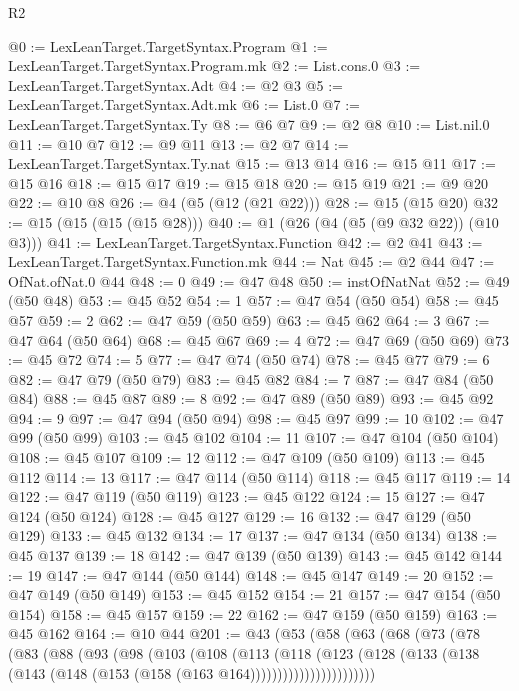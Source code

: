 \begin{lexlean}{R2}
\begin{coremodule}
@0 := LexLeanTarget.TargetSyntax.Program
@1 := LexLeanTarget.TargetSyntax.Program.mk
@2 := List.cons.{0}
@3 := LexLeanTarget.TargetSyntax.Adt
@4 := @2 @3
@5 := LexLeanTarget.TargetSyntax.Adt.mk
@6 := List.{0}
@7 := LexLeanTarget.TargetSyntax.Ty
@8 := @6 @7
@9 := @2 @8
@10 := List.nil.{0}
@11 := @10 @7
@12 := @9 @11
@13 := @2 @7
@14 := LexLeanTarget.TargetSyntax.Ty.nat
@15 := @13 @14
@16 := @15 @11
@17 := @15 @16
@18 := @15 @17
@19 := @15 @18
@20 := @15 @19
@21 := @9 @20
@22 := @10 @8
@26 := @4 (@5 (@12 (@21 @22)))
@28 := @15 (@15 @20)
@32 := @15 (@15 (@15 (@15 @28)))
@40 := @1 (@26 (@4 (@5 (@9 @32 @22)) (@10 @3)))
@41 := LexLeanTarget.TargetSyntax.Function
@42 := @2 @41
@43 := LexLeanTarget.TargetSyntax.Function.mk
@44 := Nat
@45 := @2 @44
@47 := OfNat.ofNat.{0} @44
@48 := 0
@49 := @47 @48
@50 := instOfNatNat
@52 := @49 (@50 @48)
@53 := @45 @52
@54 := 1
@57 := @47 @54 (@50 @54)
@58 := @45 @57
@59 := 2
@62 := @47 @59 (@50 @59)
@63 := @45 @62
@64 := 3
@67 := @47 @64 (@50 @64)
@68 := @45 @67
@69 := 4
@72 := @47 @69 (@50 @69)
@73 := @45 @72
@74 := 5
@77 := @47 @74 (@50 @74)
@78 := @45 @77
@79 := 6
@82 := @47 @79 (@50 @79)
@83 := @45 @82
@84 := 7
@87 := @47 @84 (@50 @84)
@88 := @45 @87
@89 := 8
@92 := @47 @89 (@50 @89)
@93 := @45 @92
@94 := 9
@97 := @47 @94 (@50 @94)
@98 := @45 @97
@99 := 10
@102 := @47 @99 (@50 @99)
@103 := @45 @102
@104 := 11
@107 := @47 @104 (@50 @104)
@108 := @45 @107
@109 := 12
@112 := @47 @109 (@50 @109)
@113 := @45 @112
@114 := 13
@117 := @47 @114 (@50 @114)
@118 := @45 @117
@119 := 14
@122 := @47 @119 (@50 @119)
@123 := @45 @122
@124 := 15
@127 := @47 @124 (@50 @124)
@128 := @45 @127
@129 := 16
@132 := @47 @129 (@50 @129)
@133 := @45 @132
@134 := 17
@137 := @47 @134 (@50 @134)
@138 := @45 @137
@139 := 18
@142 := @47 @139 (@50 @139)
@143 := @45 @142
@144 := 19
@147 := @47 @144 (@50 @144)
@148 := @45 @147
@149 := 20
@152 := @47 @149 (@50 @149)
@153 := @45 @152
@154 := 21
@157 := @47 @154 (@50 @154)
@158 := @45 @157
@159 := 22
@162 := @47 @159 (@50 @159)
@163 := @45 @162
@164 := @10 @44
@201 := @43
    (@53
      (@58
        (@63
          (@68
            (@73
              (@78
                (@83
                  (@88
                    (@93
                      (@98
                        (@103
                          (@108
                            (@113
                              (@118
                                (@123
                                  (@128
                                    (@133
                                      (@138
                                        (@143 (@148 (@153 (@158 (@163 @164)))))))))))))))))))))))

\end{coremodule}
\end{lexlean}
